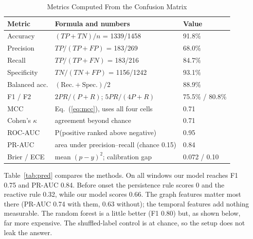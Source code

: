 \documentclass[conference,a4paper]{IEEEtran}
\begin{document}
\begin{table}[!t]
\caption{Metrics Computed From the Confusion Matrix}
\label{tab:metrics}
\centering
\small
\setlength{\tabcolsep}{4pt}
\begin{tabular}{|L{1.75cm}|L{3.95cm}|L{1.45cm}|}
\hline
\textbf{Metric} & \textbf{Formula and numbers} & \textbf{Value} \\ \hline
Accuracy & $(TP+TN)/n$ = 1339/1458 & 91.8\% \\ \hline
Precision & $TP/(TP+FP)$ = 183/269 & 68.0\% \\ \hline
Recall & $TP/(TP+FN)$ = 183/216 & 84.7\% \\ \hline
Specificity & $TN/(TN+FP)$ = 1156/1242 & 93.1\% \\ \hline
Balanced acc. & $(\text{Rec.}+\text{Spec.})/2$ & 88.9\% \\ \hline
F1 / F2 & $2PR/(P+R)$; $5PR/(4P+R)$ & 75.5\% / 80.8\% \\ \hline
MCC & Eq.~(\ref{eq:mcc}), uses all four cells & 0.71 \\ \hline
Cohen's $\kappa$ & agreement beyond chance & 0.71 \\ \hline
ROC-AUC & P(positive ranked above negative) & 0.95 \\ \hline
PR-AUC & area under precision--recall (chance 0.15) & 0.84 \\ \hline
Brier / ECE & mean $(p-y)^2$; calibration gap & 0.072 / 0.10 \\ \hline
\end{tabular}
\end{table}

Table~\ref{tab:pred} compares the methods. On all windows our model reaches F1 0.75 and PR-AUC 0.84. Before onset the persistence rule scores 0 and the reactive rule 0.32, while our model scores 0.66. The graph features matter most there (PR-AUC 0.74 with them, 0.63 without); the temporal features add nothing measurable. The random forest is a little better (F1 0.80) but, as shown below, far more expensive. The shuffled-label control is at chance, so the setup does not leak the answer.
\end{document}
